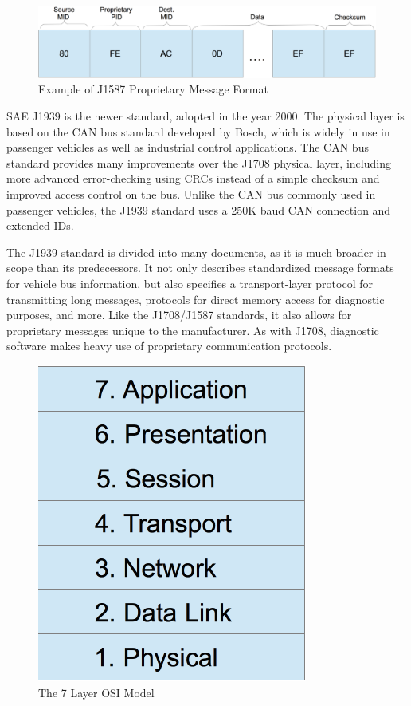 \begin{figure}[h]
  \centering
  \includegraphics[scale=0.6]{J1708Proprietary}
  \caption{Example of J1587 Proprietary Message Format}
  \label{fig:j1587-proprietary}
\end{figure}


SAE J1939\cite{J1939-71} is the newer standard, adopted in the year 2000. The physical layer is based on the CAN bus standard developed by Bosch\cite{Bosch1991}, which is widely in use
in passenger vehicles as well as industrial control applications. The CAN bus standard provides many improvements over the J1708 physical layer,
including more advanced error-checking using CRCs instead of a simple checksum and improved access control on the bus. Unlike the CAN bus commonly used in
passenger vehicles, the J1939 standard uses a 250K baud CAN connection and extended IDs.

The J1939 standard is divided into many documents, as it is much broader in scope than its predecessors. It not only describes standardized
message formats for vehicle bus information, but also specifies a transport-layer protocol for transmitting long messages, protocols for
direct memory access for diagnostic purposes, and more. Like the J1708/J1587 standards, it also allows for proprietary messages unique
to the manufacturer. As with J1708, diagnostic software makes heavy use of proprietary communication protocols.

\begin{figure}[h]
  \centering
  \includegraphics[scale=.75]{OSIModel}
  \caption{The 7 Layer OSI Model\cite{Day1983}}
  \label{fig:osimodel}
\end{figure}

